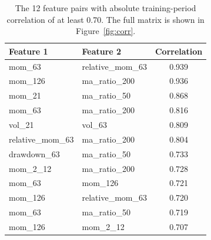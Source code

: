 \begin{table}[H]
\centering
\small
\begin{tabular}{llc}
\toprule
Feature 1 & Feature 2 & Correlation \\
\midrule
mom\_63 & relative\_mom\_63 & 0.939 \\
mom\_126 & ma\_ratio\_200 & 0.936 \\
mom\_21 & ma\_ratio\_50 & 0.868 \\
mom\_63 & ma\_ratio\_200 & 0.816 \\
vol\_21 & vol\_63 & 0.809 \\
relative\_mom\_63 & ma\_ratio\_200 & 0.804 \\
drawdown\_63 & ma\_ratio\_50 & 0.733 \\
mom\_2\_12 & ma\_ratio\_200 & 0.728 \\
mom\_63 & mom\_126 & 0.721 \\
mom\_126 & relative\_mom\_63 & 0.720 \\
mom\_63 & ma\_ratio\_50 & 0.719 \\
mom\_126 & mom\_2\_12 & 0.707 \\
\bottomrule
\end{tabular}
\caption{The 12 feature pairs with absolute training-period correlation of at least 0.70. The full matrix is shown in Figure~\ref{fig:corr}.}
\label{tab:corr}
\end{table}
